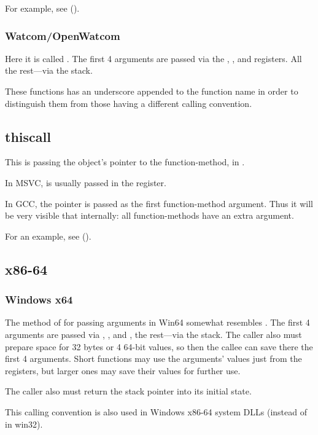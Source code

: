 For example, see ().

\subsubsection{Watcom/OpenWatcom}

Here it is called .
The first 4 arguments are passed via the \EAX, \EDX, \EBX and \ECX registers.
All the rest---via the stack.

These functions has an underscore appended to the function name in order to distinguish them from 
those having a different calling convention.

\subsection{thiscall}

This is passing the object's \ITthis pointer to the function-method, in \Cpp.

In MSVC, \ITthis is usually passed in the \ECX register.

In GCC, the \ITthis pointer is passed as the first function-method argument.
Thus it will be very visible that internally: all function-methods have an extra argument.

For an example, see ().

\subsection{x86-64}

\subsubsection{Windows x64}
\label{sec:callingconventions_win64}

The method of for passing arguments in Win64 somewhat resembles .
The first 4 arguments are passed via \RCX, \RDX,  and , the rest---via the stack.
The \gls{caller} also must prepare space for 32 bytes or 4 64-bit values,
so then the \gls{callee} can save there the first 4 arguments.
Short functions may use the arguments' values just from the registers,
but larger ones may save their values for further use.

The \gls{caller} also must return the \gls{stack pointer} into its initial state.

This calling convention is also used in Windows x86-64 system DLLs 
(instead of  in win32).

